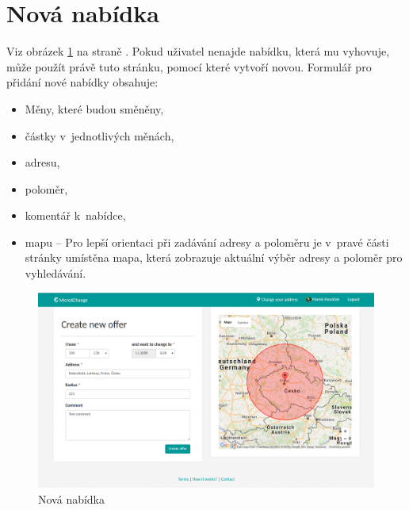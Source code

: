 \section{Nová nabídka}

\label{nur:new-offer}

Viz obrázek \ref{fig:tur:new-offer} na straně \pageref{fig:tur:new-offer}. Pokud uživatel nenajde nabídku, která mu vyhovuje, může použít právě tuto stránku, pomocí které vytvoří novou. Formulář pro přidání nové nabídky obsahuje:
\begin{itemize}
    \item Měny, které budou směněny,
    \item částky v~jednotlivých měnách,
	\item adresu,
	\item poloměr,
	\item komentář k~nabídce,
	\item mapu -- Pro lepší orientaci při zadávání adresy a poloměru je v~pravé části stránky umístěna mapa, která zobrazuje aktuální výběr adresy a poloměr pro vyhledávání.
\end{itemize}

\begin{figure}[!h]
    \centering
    \includegraphics[width=1.0\textwidth]{media/tur/new-offer.png}
    \caption{Nová nabídka}
    \label{fig:tur:new-offer}
\end{figure}